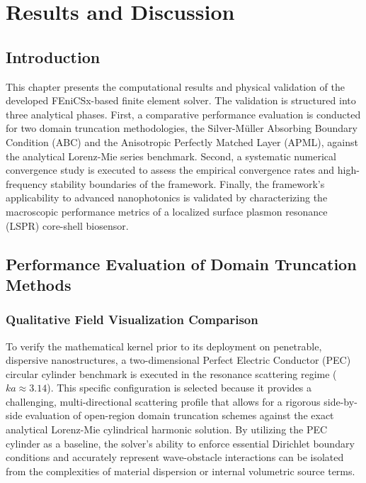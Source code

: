 \documentclass[class=report, crop=false]{standalone}
\begin{document}
\chapter{Results and Discussion}

\section{Introduction}

This chapter presents the computational results and physical validation of the developed FEniCSx-based finite element solver. The validation is structured into three analytical phases. First, a comparative performance evaluation is conducted for two domain truncation methodologies, the Silver-M\"{u}ller Absorbing Boundary Condition (ABC) and the Anisotropic Perfectly Matched Layer (APML), against the analytical Lorenz-Mie series benchmark. Second, a systematic numerical convergence study is executed to assess the empirical convergence rates and high-frequency stability boundaries of the framework. Finally, the framework's applicability to advanced nanophotonics is validated by characterizing the macroscopic performance metrics of a localized surface plasmon resonance (LSPR) core-shell biosensor.

\section{Performance Evaluation of Domain Truncation Methods}

\subsection{Qualitative Field Visualization Comparison}

To verify the mathematical kernel prior to its deployment on penetrable, dispersive nanostructures, a two-dimensional Perfect Electric Conductor (PEC) circular cylinder benchmark is executed in the resonance scattering regime ($ka \approx 3.14$). This specific configuration is selected because it provides a challenging, multi-directional scattering profile that allows for a rigorous side-by-side evaluation of open-region domain truncation schemes against the exact analytical Lorenz-Mie cylindrical harmonic solution. By utilizing the PEC cylinder as a baseline, the solver's ability to enforce essential Dirichlet boundary conditions and accurately represent wave-obstacle interactions can be isolated from the complexities of material dispersion or internal volumetric source terms.
\end{document}
